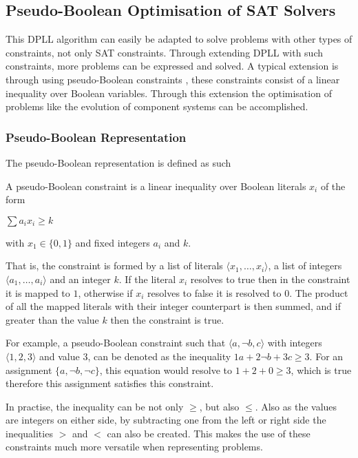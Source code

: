 \subsection{Pseudo-Boolean Optimisation of SAT Solvers}
This DPLL algorithm can easily be adapted to solve problems with other types of constraints, not only SAT constraints.
Through extending DPLL with such constraints, more problems can be expressed and solved.
A typical extension is through using pseudo-Boolean constraints \citep{dixon2004automating}, these constraints consist of a linear inequality over Boolean variables.
Through this extension the optimisation of problems like the evolution of component systems can be accomplished.

\subsubsection{Pseudo-Boolean Representation}
The pseudo-Boolean representation is defined as such

\begin{defs}
A pseudo-Boolean constraint is a linear inequality over Boolean literals $x_i$ of the form

$\sum a_i x_i \geq k$

with $x_1 \in \{0,1\}$ and fixed integers $a_i$ and $k$.
\end{defs}

That is, the constraint is formed by a list of literals $\langle x_1,\ldots,x_i \rangle$, a list of integers $\langle a_1,\ldots,a_i \rangle$ and an integer $k$.
If the literal $x_i$ resolves to true then in the constraint it is mapped to $1$, otherwise  if $x_i$ resolves to false it is resolved to $0$.
The product of all the mapped literals with their integer counterpart is then summed, and if greater than the value $k$ then the constraint is true. 

For example, a pseudo-Boolean constraint such that $\langle a, \neg b , c\rangle$ with integers $\langle 1, 2, 3\rangle$ and value $3$,
can be denoted as the inequality $1a + 2 \neg b + 3c \geq 3$.
For an assignment $\{a , \neg b, \neg c\}$, this equation would resolve to $1 + 2 + 0 \geq 3$, which is true therefore this assignment satisfies this constraint.

In practise, the inequality can be not only $\geq$, but also $\leq$.
Also as the values are integers on either side, by subtracting one from the left or right side the inequalities $>$ and $<$ can also be created.
This makes the use of these constraints much more versatile when representing problems.

